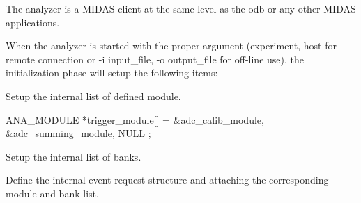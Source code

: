 \begin{DoxyItemize}
\item The analyzer is a MIDAS client at the same level as the odb or any other MIDAS applications.
\item When the analyzer is started with the proper argument (experiment, host for remote connection or -\/i input\_\-file, -\/o output\_\-file for off-\/line use), the initialization phase will setup the following items:
\begin{DoxyEnumerate}
\item Setup the internal list of defined module. 
\begin{DoxyCode}
 ANA_MODULE *trigger_module[] = {
    &adc_calib_module,
    &adc_summing_module,
    NULL
 };
\end{DoxyCode}

\item Setup the internal list of banks. 
\begin{DoxyCode}
 BANK_LIST ana_trigger_bank_list[] = {
 
    /* online banks */
    {"ADC0", TID_STRUCT, sizeof(ADC0_BANK), ana_adc0_bank_str}
    ,
    {"TDC0", TID_WORD, N_TDC, NULL}
    , ...
\end{DoxyCode}

\item Define the internal event request structure and attaching the corresponding module and bank list. 
\begin{DoxyCode}
   ANALYZE_REQUEST analyze_request[] = {
   {"Trigger",                  /* equipment name */
    {1,                         /* event ID */
     TRIGGER_ALL,               /* trigger mask */
     GET_SOME,                  /* get some events */
     "SYSTEM",                  /* event buffer */
     TRUE,                      /* enabled */
     "", "",}
    ,
    NULL,                       /* analyzer routine */
    trigger_module,             /* module list */
    ana_trigger_bank_list,      /* bank list */
    1000,                       /* RWNT buffer size */
    TRUE,                       /* Use tests for this event */
    }
   , ...
\end{DoxyCode}


\end{DoxyEnumerate}
\end{DoxyItemize}

